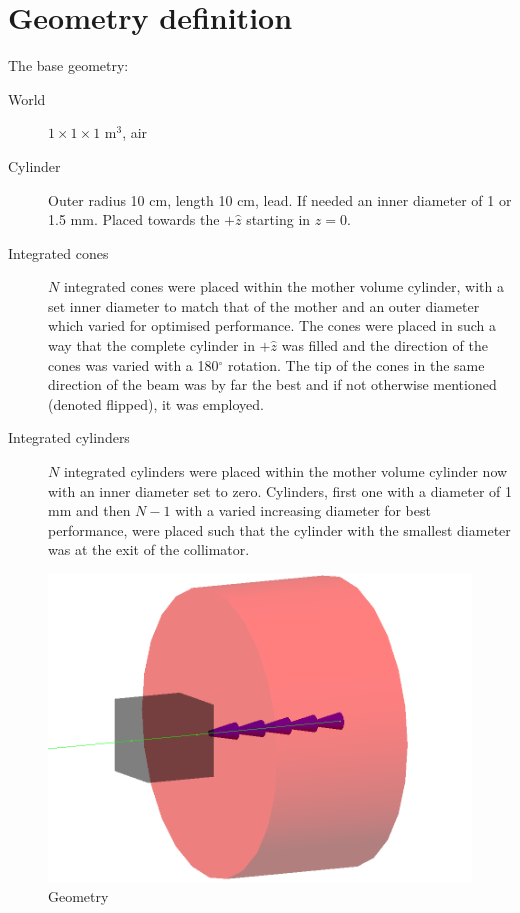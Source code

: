 \documentclass[a4paper]{article}
\begin{document}
\section{Geometry definition}
The base geometry:
\begin{description}
  \item[World] $1 \times 1 \times 1$ m$^3$, air
  \item[Cylinder] Outer radius 10 cm, length 10 cm, lead. If needed an inner diameter of 1 or 1.5 mm. Placed towards the $+\hat{z}$ starting in $z = 0$.
  \item[Integrated cones] $N$ integrated cones were placed within the mother volume cylinder, with a set inner diameter to match that of the mother and an outer diameter which varied for optimised performance.
The cones were placed in such a way that the complete cylinder in $+\hat{z}$ was filled and the direction of the cones was varied with a 180$^\circ$ rotation.
The tip of the cones in the same direction of the beam was by far the best and if not otherwise mentioned (denoted flipped), it was employed.
  \item[Integrated cylinders] $N$ integrated cylinders were placed within the mother volume cylinder now with an inner diameter set to zero. Cylinders, first one with a diameter of 1 mm and then $N-1$ with a varied increasing diameter for best performance, were placed such that the cylinder with the smallest diameter was at the exit of the collimator.
\end{description}

\begin{figure}[H]
  \centering
  \includegraphics[width=\textwidth]{geometry.png}
  \caption{Geometry}
  \label{fig:geometry}
\end{figure}
\end{document}
